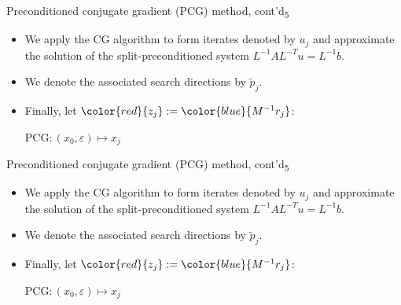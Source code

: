 \documentclass[t,usepdftitle=false]{beamer}
\begin{document}
\setcounter{framenumber}{8}
\begin{frame}{Preconditioned conjugate gradient (PCG) method, cont'd\textsubscript{5}}
\begin{itemize}
\item We apply the CG algorithm to form iterates denoted by $u_j$ and approximate the solution of the split-preconditioned system $L^{-1}AL^{-T}u=L^{-1}b$.
\item[] We denote the associated search directions by $\tilde{p}_j$.
\item[] Finally, let ${\color{red}{z_j}}:={\color{blue}{M^{-1}r_j}}$:
\vspace{-.25cm}
\setcounter{algorithm}{3}
\begin{algorithm}[H]
\small
\caption{PCG$:(x_0,\varepsilon)\mapsto x_j$}
\begin{algorithmic}[1]
\ENDFOR
\end{algorithmic}
\end{algorithm}
\end{itemize}
\end{frame}
\setcounter{framenumber}{8}
\begin{frame}{Preconditioned conjugate gradient (PCG) method, cont'd\textsubscript{5}}
\begin{itemize}
\item We apply the CG algorithm to form iterates denoted by $u_j$ and approximate the solution of the split-preconditioned system $L^{-1}AL^{-T}u=L^{-1}b$.
\item[] We denote the associated search directions by $\tilde{p}_j$.
\item[] Finally, let ${\color{red}{z_j}}:={\color{blue}{M^{-1}r_j}}$:
\vspace{-.25cm}
\setcounter{algorithm}{3}
\begin{algorithm}[H]
\small
\caption{PCG$:(x_0,\varepsilon)\mapsto x_j$}
\begin{algorithmic}[1]
\ENDFOR
\end{algorithmic}
\end{algorithm}
\end{itemize}
\end{frame}
\end{document}
